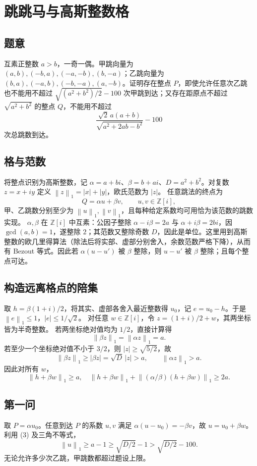 \documentclass[UTF8,11pt,a4paper,fontset=fandol]{ctexart}
\newcommand{\Z}{\mathbb Z}
\newcommand{\norm}[1]{\left\lVert #1\right\rVert}
\begin{document}
\section{跳跳马与高斯整数格}
\subsection*{题意}
互素正整数 $a>b$，一奇一偶。甲跳向量为 $(a,b),(-b,a),(-a,-b),(b,-a)$；乙跳向量为 $(b,a),(-a,b),(-b,-a),(a,-b)$。证明存在整点 $P$，即使允许任意次乙跳也不能用不超过 $\sqrt{(a^2+b^2)/2}-100$ 次甲跳到达；又存在距原点不超过 $\sqrt{a^2+b^2}$ 的整点 $Q$，不能用不超过
\[
\frac{\sqrt2\,a(a+b)}{\sqrt{a^2+2ab-b^2}}-100
\]
次总跳数到达。
\subsection*{格与范数}
将整点识别为高斯整数，记 $\alpha=a+bi$、$\beta=b+ai$、$D=a^2+b^2$。对复数 $z=x+iy$ 定义 $\norm{z}_1=|x|+|y|$，欧氏范数为 $|z|$。
任意跳法的终点为
\[
Q=\alpha u+\beta v,\qquad u,v\in\Z[i],
\]
甲、乙跳数分别至少为 $\norm{u}_1,\norm{v}_1$，且每种给定系数均可用恰为该范数的跳数实现。
$\alpha,\beta$ 在 $\Z[i]$ 中互素：公因子整除 $\alpha-i\beta=2a$ 与 $\alpha+i\beta=2bi$，因 $\gcd(a,b)=1$，遂整除 $2$；其范数又整除奇数 $D$，因此是单位。这里用到高斯整数的欧几里得算法（除法后将实部、虚部分别舍入，余数范数严格下降），从而有 Bezout 等式。因此若 $\alpha(u-u')$ 被 $\beta$ 整除，则 $u-u'$ 被 $\beta$ 整除；且每个整点可达。
\subsection*{构造远离格点的陪集}
取 $h=\beta(1+i)/2$，将其实、虚部各舍入最近整数得 $u_0$，记 $e=u_0-h$。于是 $\norm{e}_1\le1$，$|e|\le1/\sqrt2$。
对任意 $w\in\Z[i]$，令 $z=(1+i)/2+w$，其两坐标皆为半奇整数。
若两坐标绝对值均为 $1/2$，直接计算得
\[
\norm{\beta z}_1=\norm{\alpha z}_1=a.
\]
若至少一个坐标绝对值不小于 $3/2$，则
$|z|\ge\sqrt{5/2}$，故
\[
\norm{\beta z}_1\ge|\beta z|=\sqrt D\,|z|>a,
\qquad
\norm{\alpha z}_1>a.
\]
因此对所有 $w$，
\[
\norm{h+\beta w}_1\ge a,\quad
\norm{h+\beta w}_1+
\norm{(\alpha/\beta)(h+\beta w)}_1\ge2a. \tag{3}
\]
\subsection*{第一问}
取 $P=\alpha u_0$。任意到达 $P$ 的系数 $u,v$ 满足
$\alpha(u-u_0)=-\beta v$，故 $u=u_0+\beta w$。
利用 (3) 及三角不等式，
\[
\norm{u}_1\ge a-1\ge\sqrt{D/2}-1>\sqrt{D/2}-100.
\]
无论允许多少次乙跳，甲跳数都超过题设上限。
\end{document}
